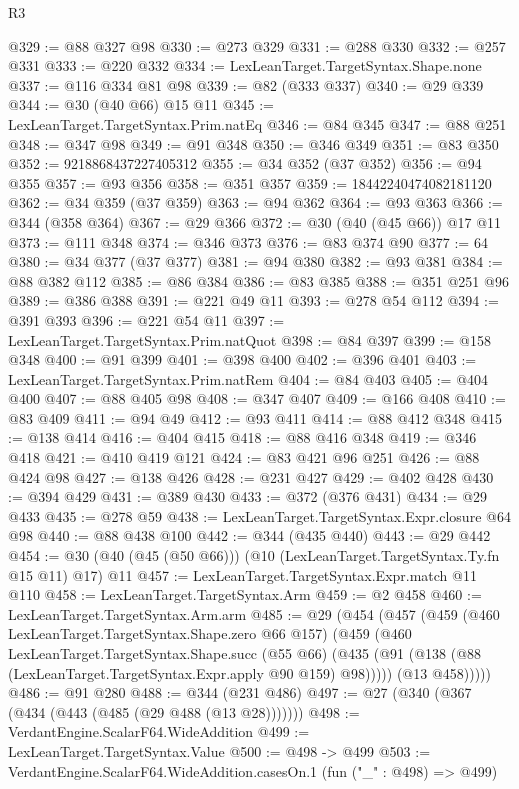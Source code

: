 \begin{lexlean}{R3}
\begin{coremodule}
@329 := @88 @327 @98
@330 := @273 @329
@331 := @288 @330
@332 := @257 @331
@333 := @220 @332
@334 := LexLeanTarget.TargetSyntax.Shape.none
@337 := @116 @334 @81 @98
@339 := @82 (@333 @337)
@340 := @29 @339
@344 := @30 (@40 @66) @15 @11
@345 := LexLeanTarget.TargetSyntax.Prim.natEq
@346 := @84 @345
@347 := @88 @251
@348 := @347 @98
@349 := @91 @348
@350 := @346 @349
@351 := @83 @350
@352 := 9218868437227405312
@355 := @34 @352 (@37 @352)
@356 := @94 @355
@357 := @93 @356
@358 := @351 @357
@359 := 18442240474082181120
@362 := @34 @359 (@37 @359)
@363 := @94 @362
@364 := @93 @363
@366 := @344 (@358 @364)
@367 := @29 @366
@372 := @30 (@40 (@45 @66)) @17 @11
@373 := @111 @348
@374 := @346 @373
@376 := @83 @374 @90
@377 := 64
@380 := @34 @377 (@37 @377)
@381 := @94 @380
@382 := @93 @381
@384 := @88 @382 @112
@385 := @86 @384
@386 := @83 @385
@388 := @351 @251 @96
@389 := @386 @388
@391 := @221 @49 @11
@393 := @278 @54 @112
@394 := @391 @393
@396 := @221 @54 @11
@397 := LexLeanTarget.TargetSyntax.Prim.natQuot
@398 := @84 @397
@399 := @158 @348
@400 := @91 @399
@401 := @398 @400
@402 := @396 @401
@403 := LexLeanTarget.TargetSyntax.Prim.natRem
@404 := @84 @403
@405 := @404 @400
@407 := @88 @405 @98
@408 := @347 @407
@409 := @166 @408
@410 := @83 @409
@411 := @94 @49
@412 := @93 @411
@414 := @88 @412 @348
@415 := @138 @414
@416 := @404 @415
@418 := @88 @416 @348
@419 := @346 @418
@421 := @410 @419 @121
@424 := @83 @421 @96 @251
@426 := @88 @424 @98
@427 := @138 @426
@428 := @231 @427
@429 := @402 @428
@430 := @394 @429
@431 := @389 @430
@433 := @372 (@376 @431)
@434 := @29 @433
@435 := @278 @59
@438 := LexLeanTarget.TargetSyntax.Expr.closure @64 @98
@440 := @88 @438 @100
@442 := @344 (@435 @440)
@443 := @29 @442
@454 := @30 (@40 (@45 (@50 @66))) (@10 (LexLeanTarget.TargetSyntax.Ty.fn @15 @11) @17) @11
@457 := LexLeanTarget.TargetSyntax.Expr.match @11 @110
@458 := LexLeanTarget.TargetSyntax.Arm
@459 := @2 @458
@460 := LexLeanTarget.TargetSyntax.Arm.arm
@485 := @29
    (@454
      (@457
        (@459
          (@460 LexLeanTarget.TargetSyntax.Shape.zero @66 @157)
          (@459
            (@460
              LexLeanTarget.TargetSyntax.Shape.succ
              (@55 @66)
              (@435 (@91 (@138 (@88 (LexLeanTarget.TargetSyntax.Expr.apply @90 @159) @98)))))
            (@13 @458)))))
@486 := @91 @280
@488 := @344 (@231 @486)
@497 := @27 (@340 (@367 (@434 (@443 (@485 (@29 @488 (@13 @28)))))))
@498 := VerdantEngine.ScalarF64.WideAddition
@499 := LexLeanTarget.TargetSyntax.Value
@500 := @498 -> @499
@503 := VerdantEngine.ScalarF64.WideAddition.casesOn.{1} (fun ("_" : @498) => @499)

\end{coremodule}
\end{lexlean}
